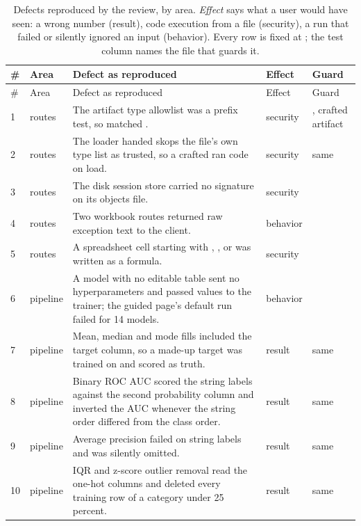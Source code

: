 \small\begin{longtable}{@{}L{0.5cm}L{1.6cm}L{7.6cm}L{1.6cm}L{3.4cm}@{}}
\caption{Defects reproduced by the review, by area. \emph{Effect} says what a user would have seen: a wrong number (result), code execution from a file (security), a run that failed or silently ignored an input (behavior). Every row is fixed at ; the test column names the file that guards it.}\label{tab:defects}\\
\toprule
\# & Area & Defect as reproduced & Effect & Guard \\
\midrule
\endfirsthead
\toprule
\# & Area & Defect as reproduced & Effect & Guard \\
\midrule
{} & routes & The artifact type allowlist was a prefix test, so  matched . & security & , crafted artifact \\
2 & routes & The loader handed skops the file's own type list as trusted, so a crafted  ran code on load. & security & same \\
3 & routes & The disk session store carried no signature on its objects file. & security &  \\
4 & routes & Two workbook routes returned raw exception text to the client. & behavior &  \\
5 & routes & A spreadsheet cell starting with \code{=}, \code{+}, \code{-} or  was written as a formula. & security &  \\
6 & pipeline & A model with no editable table sent no hyperparameters and  passed  values to the trainer; the guided page's default run failed for 14 models. & behavior &  \\
7 & pipeline & Mean, median and mode fills included the target column, so a made-up target was trained on and scored as truth. & result & same \\
8 & pipeline & Binary ROC AUC scored the string labels against the second probability column and inverted the AUC whenever the string order differed from the class order. & result & same \\
9 & pipeline & Average precision failed on string labels and was silently omitted. & result & same \\
10 & pipeline & IQR and z-score outlier removal read the one-hot columns and deleted every training row of a category under 25 percent. & result & same \\

\end{longtable}

